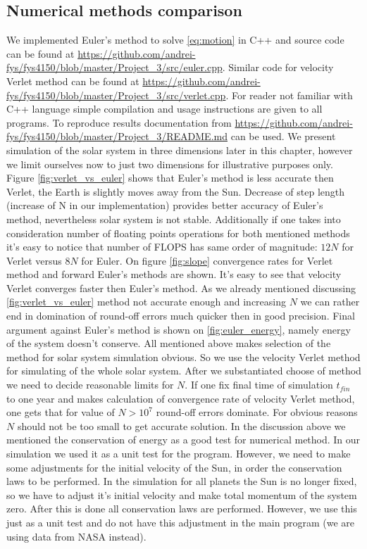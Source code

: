 \documentclass[10pt]{article}
\begin{document}
\subsection{Numerical methods comparison}
We implemented Euler's method to solve \ref{eq:motion} in C++ and source code can be found at \url{https://github.com/andrei-fys/fys4150/blob/master/Project_3/src/euler.cpp}. Similar code for velocity Verlet method can be found at \url{https://github.com/andrei-fys/fys4150/blob/master/Project_3/src/verlet.cpp}. For reader not familiar with C++ language simple compilation and usage instructions are given to all programs. To reproduce results documentation from \url{https://github.com/andrei-fys/fys4150/blob/master/Project_3/README.md} can be used.
We present simulation of the solar system in three dimensions later in this chapter, however  we limit ourselves now to just two  dimensions for illustrative purposes only. 
Figure \ref{fig:verlet_vs_euler} shows that Euler's method is less accurate then Verlet, the Earth is slightly moves away from the Sun. Decrease of step length (increase of N in our implementation) provides better accuracy of Euler's method, nevertheless solar system is not stable. Additionally if one takes into consideration number of floating points operations for both mentioned methods it's easy to notice that number of FLOPS has same order of magnitude: $12N$ for Verlet versus $8N$ for Euler. On figure \ref{fig:slope} convergence rates for Verlet method and forward Euler's methods are shown. It's easy to see that velocity Verlet converges faster then Euler's method. As we already mentioned discussing \ref{fig:verlet_vs_euler} method not accurate enough and increasing $N$ we can rather end in domination of round-off errors much quicker then in good precision. Final argument against Euler's method is shown on \ref{fig:euler_energy}, namely energy of the system doesn't conserve. All mentioned above makes selection of the method for solar system simulation obvious. So we use the velocity Verlet method for simulating of the whole solar system. After we substantiated choose of method we need to decide reasonable limits for $N$. If one fix final time of simulation $t_{fin}$ to one year and makes calculation of convergence rate of velocity Verlet method, one gets that for value of $N > 10^7$ round-off errors dominate. For obvious reasons $N$ should not be too small to get accurate solution.
In the discussion above we mentioned the conservation of energy as a good test for numerical method. In our simulation we used it as a unit test for the program. However, we need to make some adjustments for the initial velocity of the Sun, in order the conservation laws to be performed. In the simulation for all planets the Sun is no longer fixed, so we have to adjust it's initial velocity and make total momentum of the system zero. After this is done all conservation laws are performed. However, we use this just as a unit test and do not have this adjustment in the main program (we are using data from NASA instead). 
\end{document}
